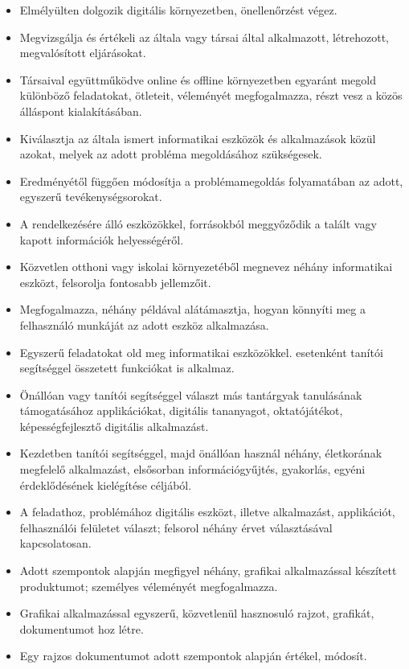 \begin{itemize}
\item
  Elmélyülten dolgozik digitális környezetben, önellenőrzést végez.
\item
  Megvizsgálja és értékeli az általa vagy társai által alkalmazott,
  létrehozott, megvalósított eljárásokat.
\item
  Társaival együttműködve online és offline környezetben egyaránt megold
  különböző feladatokat, ötleteit, véleményét megfogalmazza, részt vesz
  a közös álláspont kialakításában.
\item
  Kiválasztja az általa ismert informatikai eszközök és alkalmazások
  közül azokat, melyek az adott probléma megoldásához szükségesek.
\item
  Eredményétől függően módosítja a problémamegoldás folyamatában az
  adott, egyszerű tevékenységsorokat.
\item
  A rendelkezésére álló eszközökkel, forrásokból meggyőződik a talált
  vagy kapott információk helyességéről.
\item
  Közvetlen otthoni vagy iskolai környezetéből megnevez néhány
  informatikai eszközt, felsorolja fontosabb jellemzőit.
\item
  Megfogalmazza, néhány példával alátámasztja, hogyan könnyíti meg a
  felhasználó munkáját az adott eszköz alkalmazása.
\item
  Egyszerű feladatokat old meg informatikai eszközökkel. esetenként
  tanítói segítséggel összetett funkciókat is alkalmaz.
\item
  Önállóan vagy tanítói segítséggel választ más tantárgyak tanulásának
  támogatásához applikációkat, digitális tananyagot, oktatójátékot,
  képességfejlesztő digitális alkalmazást.
\item
  Kezdetben tanítói segítséggel, majd önállóan használ néhány,
  életkorának megfelelő alkalmazást, elsősorban információgyűjtés,
  gyakorlás, egyéni érdeklődésének kielégítése céljából.
\item
  A feladathoz, problémához digitális eszközt, illetve alkalmazást,
  applikációt, felhasználói felületet választ; felsorol néhány érvet
  választásával kapcsolatosan.
\item
  Adott szempontok alapján megfigyel néhány, grafikai alkalmazással
  készített produktumot; személyes véleményét megfogalmazza.
\item
  Grafikai alkalmazással egyszerű, közvetlenül hasznosuló rajzot,
  grafikát, dokumentumot hoz létre.
\item
  Egy rajzos dokumentumot adott szempontok alapján értékel, módosít.

\end{itemize}
